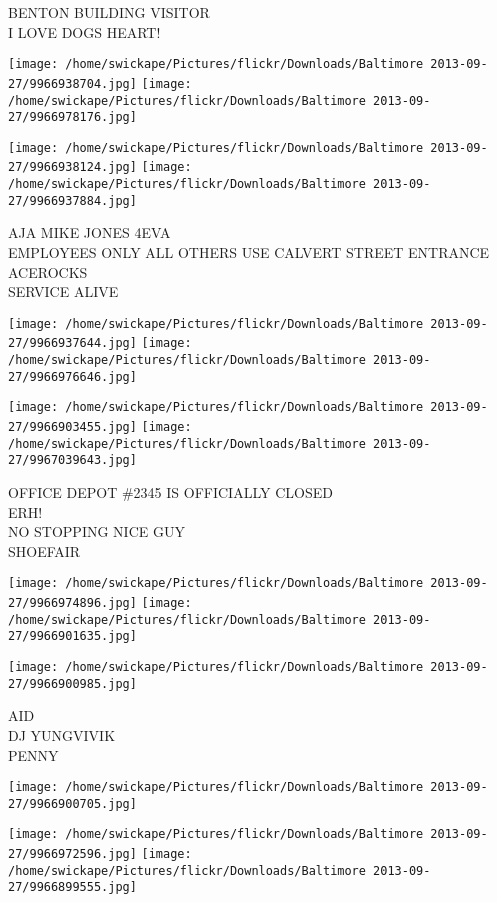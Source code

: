 \documentclass[10pt,letterpaper]{article}
\begin{document}
BENTON BUILDING VISITOR\\
I LOVE DOGS HEART!
\pagebreak

\texttt{[image: /home/swickape/Pictures/flickr/Downloads/Baltimore 2013-09-27/9966938704.jpg]}
\texttt{[image: /home/swickape/Pictures/flickr/Downloads/Baltimore 2013-09-27/9966978176.jpg]}

\texttt{[image: /home/swickape/Pictures/flickr/Downloads/Baltimore 2013-09-27/9966938124.jpg]}
\texttt{[image: /home/swickape/Pictures/flickr/Downloads/Baltimore 2013-09-27/9966937884.jpg]}

AJA MIKE JONES 4EVA\\
EMPLOYEES ONLY ALL OTHERS USE CALVERT STREET ENTRANCE\\
ACEROCKS\\
SERVICE ALIVE
\pagebreak

\texttt{[image: /home/swickape/Pictures/flickr/Downloads/Baltimore 2013-09-27/9966937644.jpg]}
\texttt{[image: /home/swickape/Pictures/flickr/Downloads/Baltimore 2013-09-27/9966976646.jpg]}

\texttt{[image: /home/swickape/Pictures/flickr/Downloads/Baltimore 2013-09-27/9966903455.jpg]}
\texttt{[image: /home/swickape/Pictures/flickr/Downloads/Baltimore 2013-09-27/9967039643.jpg]}

OFFICE DEPOT \#2345 IS OFFICIALLY CLOSED\\
ERH!\\
NO STOPPING NICE GUY\\
SHOEFAIR
\pagebreak

\texttt{[image: /home/swickape/Pictures/flickr/Downloads/Baltimore 2013-09-27/9966974896.jpg]}
\texttt{[image: /home/swickape/Pictures/flickr/Downloads/Baltimore 2013-09-27/9966901635.jpg]}

\texttt{[image: /home/swickape/Pictures/flickr/Downloads/Baltimore 2013-09-27/9966900985.jpg]}

AID\\
DJ YUNGVIVIK\\
PENNY
\pagebreak

\texttt{[image: /home/swickape/Pictures/flickr/Downloads/Baltimore 2013-09-27/9966900705.jpg]}

\vspace{0.25in}
\texttt{[image: /home/swickape/Pictures/flickr/Downloads/Baltimore 2013-09-27/9966972596.jpg]}
\texttt{[image: /home/swickape/Pictures/flickr/Downloads/Baltimore 2013-09-27/9966899555.jpg]}
\end{document}
